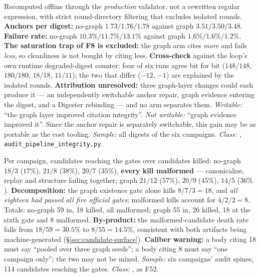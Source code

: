 \begin{description}[leftmargin=0pt,labelindent=0pt,labelsep=0pt,style=nextline,font=\normalfont,itemsep=6pt]
\item[\textbf{F52}\quad Citation integrity.]
Recomputed offline through the \emph{production} validator, not a rewritten
regular expression, with strict round-directory filtering that excludes
isolated rounds. \textbf{Anchors per digest:} no-graph $1.73/1.76/1.78$
against graph $\mathbf{3.51/3.50/3.48}$. \textbf{Failure rate:} no-graph
$10.3\%/11.7\%/13.1\%$ against graph $\mathbf{1.6\%/1.6\%/1.2\%}$.
\textbf{The saturation trap of F8 is excluded:} the graph arm cites
\emph{more} and fails \emph{less}, so cleanliness is not bought by citing
less. \textbf{Cross-check} against the loop's own runtime degraded-digest
counter: four of six runs agree bit for bit ($148/148$, $180/180$, $18/18$,
$11/11$); the two that differ ($-12$, $-1$) are explained by the isolated
rounds. \textbf{Attribution unresolved:} three graph-layer changes could
each produce it --- an independently switchable anchor repair, graph
evidence entering the digest, and a Digester rebinding --- and no arm
separates them. \emph{Writable:} ``the graph layer improved citation
integrity''. \emph{Not writable:} ``graph evidence improved it''. Since
the anchor repair is separately switchable, this gain may be as portable as
the cost tooling. \emph{Sample:} all digests of the six campaigns.
\emph{Class:} , \texttt{audit\_pipeline\_integrity.py}.

\item[\textbf{F53}\quad Gate rejection ledger, five official gates against
      the sixth.]
Per campaign, candidates reaching the gates over candidates killed:
no-graph $18/3$ ($17\%$), $21/8$ ($38\%$), $20/7$ ($35\%$), \textbf{every
kill malformed} --- canonicalize, replay and structure failing together;
graph $21/12$ ($57\%$), $20/9$ ($45\%$), $14/5$ ($36\%$).
\textbf{Decomposition:} the graph existence gate alone kills $8/7/3 = 18$,
and \emph{all eighteen had passed all five official gates}; malformed kills
account for $4/2/2 = 8$. Totals: no-graph 59 in, 18 killed, all malformed;
graph 55 in, 26 killed, 18 at the sixth gate and 8 malformed.
\textbf{By-product:} the malformed-candidate death rate falls from
$18/59 = 30.5\%$ to $8/55 = 14.5\%$, consistent with both artifacts being
machine-generated (\S\ref{sec:candidate-surface}).
\textbf{Caliber warning:} a body citing 18 must say ``pooled over three
graph seeds''; a body citing 8 must say ``one campaign only''; the two may
not be mixed. \emph{Sample:} six campaigns' audit spines, 114 candidates
reaching the gates. \emph{Class:} , as F52.


\end{description}
